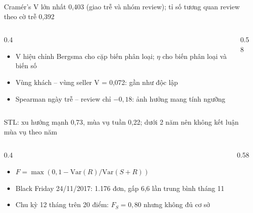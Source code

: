 \begin{frame}{Cramér's V lớn nhất 0,403 (giao trễ và nhóm review); tỉ số tương quan review theo cờ trễ 0,392}
\begin{columns}[T]\begin{column}{0.4\textwidth}
\begin{itemize}
  \item V hiệu chỉnh Bergsma cho cặp biến phân loại; $\eta$ cho biến phân loại và biến số
  \item Vùng khách -- vùng seller V = 0,072: gần như độc lập
  \item Spearman ngày trễ -- review chỉ $-0{,}18$: ảnh hưởng mang tính ngưỡng
\end{itemize}
\end{column}\begin{column}{0.58\textwidth}
\begin{center}\end{center}
\end{column}\end{columns}

\end{frame}

\begin{frame}{STL: xu hướng mạnh 0,73, mùa vụ tuần 0,22; dưới 2 năm nên không kết luận mùa vụ theo năm}
\begin{columns}[T]\begin{column}{0.4\textwidth}
\begin{itemize}
  \item $F = \max(0, 1 - \mathrm{Var}(R)/\mathrm{Var}(S+R))$
  \item Black Friday 24/11/2017: 1.176 đơn, gấp 6,6 lần trung bình tháng 11
  \item Chu kỳ 12 tháng trên 20 điểm: $F_S = 0{,}80$ nhưng không đủ cơ sở
\end{itemize}
\end{column}\begin{column}{0.58\textwidth}
\begin{center}\end{center}
\end{column}\end{columns}

\end{frame}

